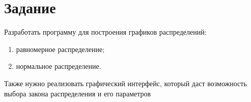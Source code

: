 
\chapter{Задание}
\label{cha:analysis}

Разработать программу для построения графиков распределений:


\begin{enumerate}
	\item равномерное распределение;
	\item нормальное распределение.
\end{enumerate}

Также нужно реализовать графический интерфейс, который даст возможность 
выбора закона распределения и его параметров






